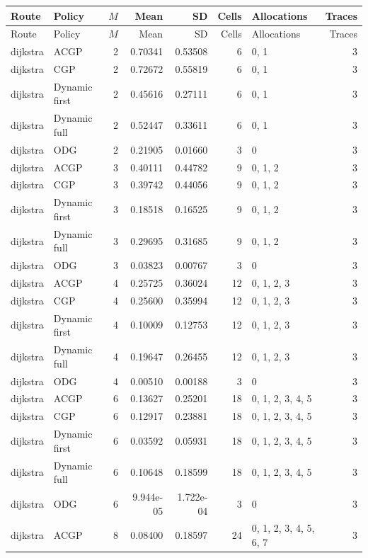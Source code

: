 \documentclass[10pt,a4paper]{article}
\begin{document}
\tiny\setlength{\tabcolsep}{2pt}\begin{longtable}{@{}p{23mm}p{29mm}rrrrp{36mm}r@{}}
\toprule Route & Policy & $M$ & Mean & SD & Cells & Allocations & Traces \\ \midrule\endfirsthead
\toprule Route & Policy & $M$ & Mean & SD & Cells & Allocations & Traces \\ \midrule\endhead
\bottomrule\endfoot
dijkstra & ACGP & 2 & 0.70341 & 0.53508 & 6 & 0, 1 & 3 \\
dijkstra & CGP & 2 & 0.72672 & 0.55819 & 6 & 0, 1 & 3 \\
dijkstra & Dynamic first & 2 & 0.45616 & 0.27111 & 6 & 0, 1 & 3 \\
dijkstra & Dynamic full & 2 & 0.52447 & 0.33611 & 6 & 0, 1 & 3 \\
dijkstra & ODG & 2 & 0.21905 & 0.01660 & 3 & 0 & 3 \\
dijkstra & ACGP & 3 & 0.40111 & 0.44782 & 9 & 0, 1, 2 & 3 \\
dijkstra & CGP & 3 & 0.39742 & 0.44056 & 9 & 0, 1, 2 & 3 \\
dijkstra & Dynamic first & 3 & 0.18518 & 0.16525 & 9 & 0, 1, 2 & 3 \\
dijkstra & Dynamic full & 3 & 0.29695 & 0.31685 & 9 & 0, 1, 2 & 3 \\
dijkstra & ODG & 3 & 0.03823 & 0.00767 & 3 & 0 & 3 \\
dijkstra & ACGP & 4 & 0.25725 & 0.36024 & 12 & 0, 1, 2, 3 & 3 \\
dijkstra & CGP & 4 & 0.25600 & 0.35994 & 12 & 0, 1, 2, 3 & 3 \\
dijkstra & Dynamic first & 4 & 0.10009 & 0.12753 & 12 & 0, 1, 2, 3 & 3 \\
dijkstra & Dynamic full & 4 & 0.19647 & 0.26455 & 12 & 0, 1, 2, 3 & 3 \\
dijkstra & ODG & 4 & 0.00510 & 0.00188 & 3 & 0 & 3 \\
dijkstra & ACGP & 6 & 0.13627 & 0.25201 & 18 & 0, 1, 2, 3, 4, 5 & 3 \\
dijkstra & CGP & 6 & 0.12917 & 0.23881 & 18 & 0, 1, 2, 3, 4, 5 & 3 \\
dijkstra & Dynamic first & 6 & 0.03592 & 0.05931 & 18 & 0, 1, 2, 3, 4, 5 & 3 \\
dijkstra & Dynamic full & 6 & 0.10648 & 0.18599 & 18 & 0, 1, 2, 3, 4, 5 & 3 \\
dijkstra & ODG & 6 & 9.944e-05 & 1.722e-04 & 3 & 0 & 3 \\
dijkstra & ACGP & 8 & 0.08400 & 0.18597 & 24 & 0, 1, 2, 3, 4, 5, 6, 7 & 3 \\

\end{longtable}
\end{document}
